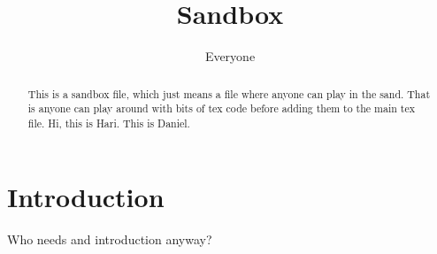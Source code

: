\documentclass{article}
\title{Sandbox}
\author{Everyone}
\begin{document}
\maketitle

\begin{abstract}
    This is a sandbox file, which just means a file where anyone can
    play in the sand. That is anyone can play around with bits of tex
    code before adding them to the main tex file. Hi, this is
    Hari. This is Daniel.
\end{abstract}

\section{Introduction}

Who needs and introduction anyway?
\end{document}

